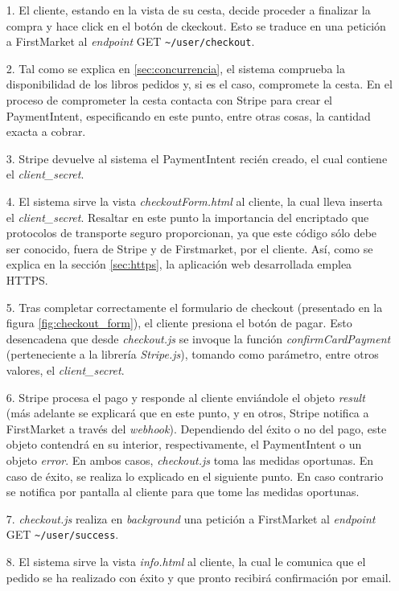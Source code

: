 \documentclass[a4paper,12pt,twoside,openright]{report}
\begin{document}
    \begin{itemize}
    	\item[1.] El cliente, estando en la vista de su cesta, decide proceder a finalizar la compra y hace click en el botón de ckeckout. Esto se traduce en una petición a FirstMarket al \emph{endpoint} GET \nolinkurl{~/user/checkout}. 
    	\item[2.] Tal como se explica en \ref{sec:concurrencia}, el sistema comprueba la disponibilidad de los libros pedidos y, si es el caso, compromete la cesta. En el proceso de comprometer la cesta contacta con Stripe para crear el PaymentIntent, especificando en este punto, entre otras cosas, la cantidad exacta a cobrar.
    	\item[3.] Stripe devuelve al sistema el PaymentIntent recién creado, el cual contiene el \emph{client\_secret}.
    	\item[4.] El sistema sirve la vista \emph{checkoutForm.html} al cliente, la cual lleva inserta el \emph{client\_secret}. Resaltar en este punto la importancia del encriptado que protocolos de transporte seguro proporcionan, ya que este código sólo debe ser conocido, fuera de Stripe y de Firstmarket, por el cliente. Así, como se explica en la sección \ref{sec:https}, la aplicación web desarrollada emplea HTTPS.
    	\item[5.] Tras completar correctamente el formulario de checkout (presentado en la figura \ref{fig:checkout_form}), el cliente presiona el botón de pagar. Esto desencadena que desde \emph{checkout.js} se invoque la función \emph{confirmCardPayment} (perteneciente a la librería \emph{Stripe.js}), tomando como parámetro, entre otros valores, el \emph{client\_secret}.
    	\item[6.] Stripe procesa el pago y responde al cliente enviándole el objeto \emph{result} (más adelante se explicará que en este punto, y en otros, Stripe notifica a FirstMarket a través del \emph{webhook}). Dependiendo del éxito o no del pago, este objeto contendrá en su interior, respectivamente, el PaymentIntent o un objeto \emph{error}. En ambos casos, \emph{checkout.js} toma las medidas oportunas. En caso de éxito, se realiza lo explicado en el siguiente punto. En caso contrario se notifica por pantalla al cliente para que tome las medidas oportunas.
    	\item[7.] \emph{checkout.js} realiza en \emph{background} una petición a FirstMarket al \emph{endpoint} GET \nolinkurl{~/user/success}.
    	\item[8.] El sistema sirve la vista \emph{info.html} al cliente, la cual le comunica que el pedido se ha realizado con éxito y que pronto recibirá confirmación por email.
    \end{itemize}
    
\end{document}
